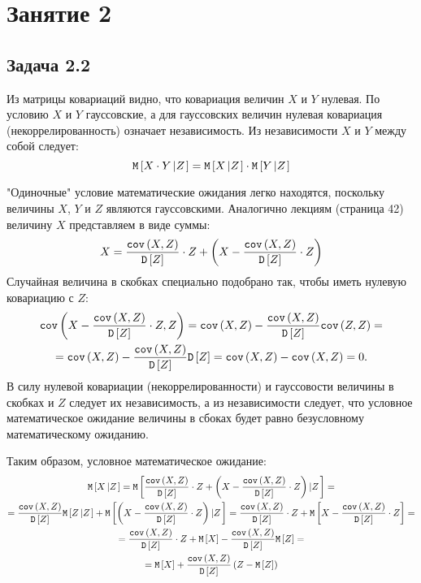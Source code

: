 \chapter{Занятие 2}

\section*{Задача 2.2}

Из матрицы ковариаций видно, что ковариация величин $X$ и $Y$ нулевая. По условию $X$ и $Y$ гауссовские, а для гауссовских величин нулевая
ковариация (некоррелированность) означает независимость. Из независимости $X$ и $Y$ между собой следует:
\begin{equation}
    \mathtt{M} \left [  X \cdot Y \left | Z \right . \right ]
    = \mathtt{M} \left [  X \left | Z \right . \right ] \cdot \mathtt{M} \left [  Y \left | Z \right . \right ]
\end{equation}

"Одиночные"{} условие математические ожидания легко находятся, поскольку величины $X$, $Y$ и $Z$ являются гауссовскими.
Аналогично лекциям (страница 42) величину $X$ представляем в виде суммы:
\begin{equation}
    X = \frac{\mathtt{cov} \left ( X, Z \right )}{\mathtt{D} \left [ Z \right ]} \cdot Z + \left ( X - \frac{\mathtt{cov} \left ( X, Z \right )}{\mathtt{D} \left [ Z \right ]} \cdot Z \right )
\end{equation}
Случайная величина в скобках специально подобрано так, чтобы иметь нулевую ковариацию с $Z$:
\begin{multline}
    \mathtt{cov} \left ( X - \frac{\mathtt{cov} \left ( X, Z \right )}{\mathtt{D} \left [ Z \right ]} \cdot Z, Z \right )
    = \mathtt{cov} \left ( X, Z \right ) - \frac{\mathtt{cov} \left ( X, Z \right )}{\mathtt{D} \left [ Z \right ]} \mathtt{cov} \left ( Z, Z \right ) = \\
    = \mathtt{cov} \left ( X, Z \right ) - \frac{\mathtt{cov} \left ( X, Z \right )}{\mathtt{D} \left [ Z \right ]} \mathtt{D} \left [ Z \right ]
    = \mathtt{cov} \left ( X, Z \right ) - \mathtt{cov} \left ( X, Z \right )
    = 0 .
\end{multline}
В силу нулевой ковариации (некоррелированности) и гауссовости величины в скобках и $Z$ следует их независимость, а из независимости
следует, что условное математическое ожидание величины в сбоках будет равно безусловному математическому ожиданию.

Таким образом, условное математическое ожидание:
\begin{multline}
    \mathtt{M} \left [  X \left | Z \right . \right ]
    = \mathtt{M} \left [  \frac{\mathtt{cov} \left ( X, Z \right )}{\mathtt{D} \left [ Z \right ]} \cdot Z + \left ( X - \frac{\mathtt{cov} \left ( X, Z \right )}{\mathtt{D} \left [ Z \right ]} \cdot Z \right ) \left | Z \right . \right ] = \\
    = \frac{\mathtt{cov} \left ( X, Z \right )}{\mathtt{D} \left [ Z \right ]} \mathtt{M} \left [  Z \left | Z \right . \right ] + \mathtt{M} \left [  \left ( X - \frac{\mathtt{cov} \left ( X, Z \right )}{\mathtt{D} \left [ Z \right ]} \cdot Z \right ) \left | Z \right . \right ]
    = \frac{\mathtt{cov} \left ( X, Z \right )}{\mathtt{D} \left [ Z \right ]} \cdot Z + \mathtt{M} \left [ X - \frac{\mathtt{cov} \left ( X, Z \right )}{\mathtt{D} \left [ Z \right ]} \cdot Z \right ] = \\
    = \frac{\mathtt{cov} \left ( X, Z \right )}{\mathtt{D} \left [ Z \right ]} \cdot Z + \mathtt{M} \left [ X \right ] - \frac{\mathtt{cov} \left ( X, Z \right )}{\mathtt{D} \left [ Z \right ]} \mathtt{M} \left [ Z \right ] = \\
    = \mathtt{M} \left [ X \right ] + \frac{\mathtt{cov} \left ( X, Z \right )}{\mathtt{D} \left [ Z \right ]} \left ( Z - \mathtt{M} \left [ Z \right ] \right )
\end{multline}

